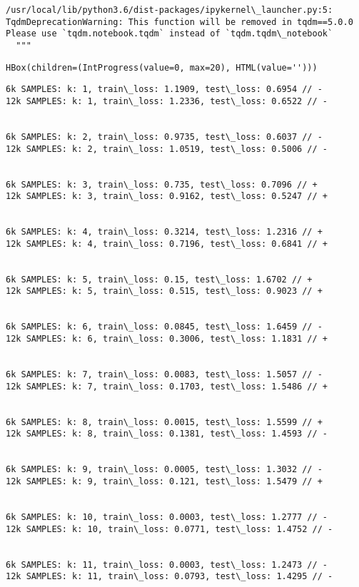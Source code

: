 \documentclass[11pt]{article}
\begin{document}
    \begin{Verbatim}[commandchars=\\\{\}]
/usr/local/lib/python3.6/dist-packages/ipykernel\_launcher.py:5:
TqdmDeprecationWarning: This function will be removed in tqdm==5.0.0
Please use `tqdm.notebook.tqdm` instead of `tqdm.tqdm\_notebook`
  """
    \end{Verbatim}

    
    \begin{verbatim}
HBox(children=(IntProgress(value=0, max=20), HTML(value='')))
    \end{verbatim}

    
    \begin{Verbatim}[commandchars=\\\{\}]
6k SAMPLES: k: 1, train\_loss: 1.1909, test\_loss: 0.6954 // -
12k SAMPLES: k: 1, train\_loss: 1.2336, test\_loss: 0.6522 // -


6k SAMPLES: k: 2, train\_loss: 0.9735, test\_loss: 0.6037 // -
12k SAMPLES: k: 2, train\_loss: 1.0519, test\_loss: 0.5006 // -


6k SAMPLES: k: 3, train\_loss: 0.735, test\_loss: 0.7096 // +
12k SAMPLES: k: 3, train\_loss: 0.9162, test\_loss: 0.5247 // +


6k SAMPLES: k: 4, train\_loss: 0.3214, test\_loss: 1.2316 // +
12k SAMPLES: k: 4, train\_loss: 0.7196, test\_loss: 0.6841 // +


6k SAMPLES: k: 5, train\_loss: 0.15, test\_loss: 1.6702 // +
12k SAMPLES: k: 5, train\_loss: 0.515, test\_loss: 0.9023 // +


6k SAMPLES: k: 6, train\_loss: 0.0845, test\_loss: 1.6459 // -
12k SAMPLES: k: 6, train\_loss: 0.3006, test\_loss: 1.1831 // +


6k SAMPLES: k: 7, train\_loss: 0.0083, test\_loss: 1.5057 // -
12k SAMPLES: k: 7, train\_loss: 0.1703, test\_loss: 1.5486 // +


6k SAMPLES: k: 8, train\_loss: 0.0015, test\_loss: 1.5599 // +
12k SAMPLES: k: 8, train\_loss: 0.1381, test\_loss: 1.4593 // -


6k SAMPLES: k: 9, train\_loss: 0.0005, test\_loss: 1.3032 // -
12k SAMPLES: k: 9, train\_loss: 0.121, test\_loss: 1.5479 // +


6k SAMPLES: k: 10, train\_loss: 0.0003, test\_loss: 1.2777 // -
12k SAMPLES: k: 10, train\_loss: 0.0771, test\_loss: 1.4752 // -


6k SAMPLES: k: 11, train\_loss: 0.0003, test\_loss: 1.2473 // -
12k SAMPLES: k: 11, train\_loss: 0.0793, test\_loss: 1.4295 // -



\end{Verbatim}
\end{document}
